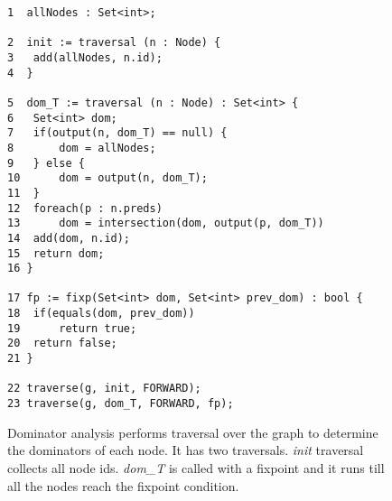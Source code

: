 \begin{figure}[ht!]
\centering
\begin{lstlisting}
1  allNodes : Set<int>;

2  init := traversal (n : Node) { 
3	add(allNodes, n.id);
4  }

5  dom_T := traversal (n : Node) : Set<int> { 
6 	Set<int> dom;
7	if(output(n, dom_T) == null) {
8		dom = allNodes;
9	} else {
10		dom = output(n, dom_T);
11	}
12	foreach(p : n.preds) 
13		dom = intersection(dom, output(p, dom_T)) 
14	add(dom, n.id); 
15	return dom; 
16 } 

17 fp := fixp(Set<int> dom, Set<int> prev_dom) : bool {
18	if(equals(dom, prev_dom))
19		return true;
20	return false;
21 }

22 traverse(g, init, FORWARD); 
23 traverse(g, dom_T, FORWARD, fp); 				
\end{lstlisting}
\caption{Dominator analysis performs traversal over the graph to determine the dominators of each node. It has two traversals. \textit{init} traversal collects all node ids. \textit{dom\_T} is called with a fixpoint and it runs till all the nodes reach the fixpoint condition.}
\label{fig:dominator}
\end{figure}


